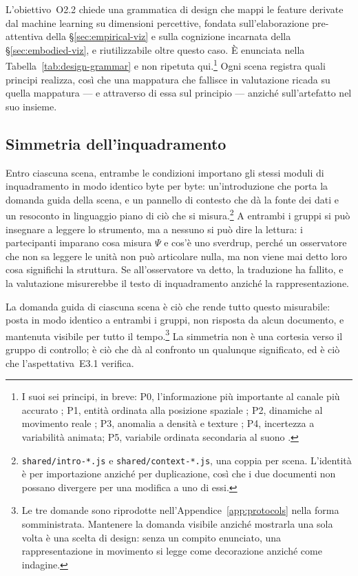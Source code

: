 L'obiettivo~O2.2 chiede una grammatica di design che mappi le feature derivate dal machine learning su dimensioni percettive, fondata sull'elaborazione pre-attentiva della \S\ref{sec:empirical-viz} e sulla cognizione incarnata della \S\ref{sec:embodied-viz}, e riutilizzabile oltre questo caso. È enunciata nella Tabella~\ref{tab:design-grammar} e non ripetuta qui.\footnote{I suoi sei principi, in breve: P0, l'informazione più importante al canale più accurato \parencite{munzner2014,bertin1983}; P1, entità ordinata alla posizione spaziale \parencite{clevelandmcgill1984}; P2, dinamiche al movimento reale \parencite{sterman2008,cronin2009}; P3, anomalia a densità e texture \parencite{bertin1983,ware2021}; P4, incertezza a variabilità animata; P5, variabile ordinata secondaria al suono \parencite{hermann2011}.} Ogni scena registra quali principi realizza, così che una mappatura che fallisce in valutazione ricada su quella mappatura --- e attraverso di essa sul principio --- anziché sull'artefatto nel suo insieme.

\subsection{Simmetria dell'inquadramento}
\label{subsec:symmetry}

Entro ciascuna scena, entrambe le condizioni importano gli stessi moduli di inquadramento in modo identico byte per byte: un'introduzione che porta la domanda guida della scena, e un pannello di contesto che dà la fonte dei dati e un resoconto in linguaggio piano di ciò che si misura.\footnote{\texttt{shared/intro-*.js} e \texttt{shared/context-*.js}, una coppia per scena. L'identità è per importazione anziché per duplicazione, così che i due documenti non possano divergere per una modifica a uno di essi.} A entrambi i gruppi si può insegnare a leggere lo strumento, ma a nessuno si può dire la lettura: i partecipanti imparano cosa misura $\Psi$ e cos'è uno sverdrup, perché un osservatore che non sa leggere le unità non può articolare nulla, ma non viene mai detto loro cosa significhi la struttura. Se all'osservatore va detto, la traduzione ha fallito, e la valutazione misurerebbe il testo di inquadramento anziché la rappresentazione.

La domanda guida di ciascuna scena è ciò che rende tutto questo misurabile: posta in modo identico a entrambi i gruppi, non risposta da alcun documento, e mantenuta visibile per tutto il tempo.\footnote{Le tre domande sono riprodotte nell'Appendice~\ref{app:protocols} nella forma somministrata. Mantenere la domanda visibile anziché mostrarla una sola volta è una scelta di design: senza un compito enunciato, una rappresentazione in movimento si legge come decorazione anziché come indagine.} La simmetria non è una cortesia verso il gruppo di controllo; è ciò che dà al confronto un qualunque significato, ed è ciò che l'aspettativa~E3.1 verifica.

